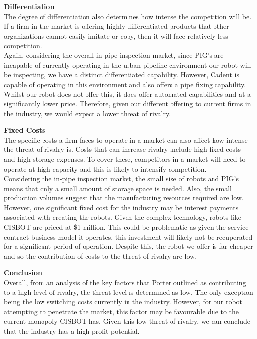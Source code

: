 \documentclass[11pt]{article}		%
\begin{document}
		        \textbf{Differentiation}\\
		        The degree of differentiation also determines how intense the competition will be. If a firm in the market is offering highly differentiated products that other organizations cannot easily imitate or copy, then it will face relatively less competition.\\
		        \hspace*{3ex}Again, considering the overall in-pipe inspection market, since PIG’s are incapable of currently operating in the urban pipeline environment our robot will be inspecting, we have a distinct differentiated capability. However, Cadent is capable of operating in this environment and also offers a pipe fixing capability. Whilst our robot does not offer this, it does offer automated capabilities and at a significantly lower price. Therefore, given our different offering to current firms in the industry, we would expect a lower threat of rivalry. 
		        
		        \textbf{Fixed Costs}\\
		        The specific costs a firm faces to operate in a market can also affect how intense the threat of rivalry is. Costs that can increase rivalry include high fixed costs and high storage expenses. To cover these, competitors in a market will need to operate at high capacity and this is likely to intensify competition.\\
		        \hspace*{3ex}Considering the in-pipe inspection market, the small size of robots and PIG’s means that only a small amount of storage space is needed. Also, the small production volumes suggest that the manufacturing resources required are low. However, one significant fixed cost for the industry may be interest payments associated with creating the robots. Given the complex technology, robots like CISBOT are priced at \$1 million. This could be problematic as given the service contract business model it operates, this investment will likely not be recuperated for a significant period of operation. Despite this, the robot we offer is far cheaper and so the contribution of costs to the threat of rivalry are low. 
		        
		        \textbf{Conclusion}\\
		        Overall, from an analysis of the key factors that Porter outlined as contributing to a high level of rivalry, the threat level is determined as low. The only exception being the low switching costs currently in the industry. However, for our robot attempting to penetrate the market, this factor may be favourable due to the current monopoly CISBOT has. Given this low threat of rivalry, we can conclude that the industry has a high profit potential.
\end{document}
